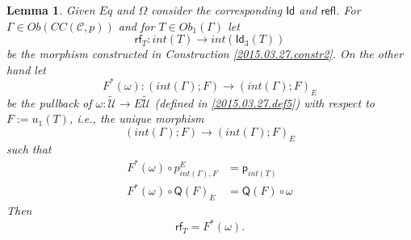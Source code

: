 \documentclass[12pt]{article}
\numberwithin{equation}{section}
\newtheorem{lemma}[proposition]{Lemma}
\newcommand{\sr}{\rightarrow}
\newcommand{\wt}{\widetilde}
\newcommand{\toCC}{CC} %
\newcommand{\C}{{\mathcal C}}  %
\newcommand{\p}{\mathsf{p}}
\newcommand{\Id}{\mathsf{Id}} %
\newcommand{\Idx}{\mathsf{Id}_3} %
\newcommand{\refl}{\mathsf{refl}}
\newcommand{\U}{\mathcal{U}}
\newcommand{\rf}{\mathsf{rf}}
\newcommand{\Q}{\mathsf{Q}}
\begin{document}
\begin{lemma}
\label{2015.03.31.l2} Given $Eq$ and $\Omega$ consider the corresponding $\Id$
and $\refl$. For $\Gamma \in Ob(\toCC({\C},p))$ and for $T\in Ob_1(\Gamma)$ let
$$\rf_T:int(T)\sr int(\Idx(T))$$
%
be the morphism constructed in Construction \ref{2015.03.27.constr2}. On the
other hand let
%
$$F^*(\omega):(int(\Gamma);F)\sr (int(\Gamma);F)_{E}$$
%
be the pullback of $\omega : \wt{\U}\sr E\wt{\U}$ (defined in \ref{2015.03.27.def5}) with respect to $F:=u_1(T)$,
i.e., the unique morphism
%
$$(int(\Gamma);F)\sr (int(\Gamma);F)_{E}$$
%
such that
%
\begin{align}
  F^*(\omega)\circ p^{E}_{int(\Gamma),F} & = \p_{int(T)}          \label{eqn1} \\
  F^*(\omega)\circ \Q(F)_{E}             & = \Q(F) \circ \omega   \label{eqn2}
\end{align}
%
Then
%
\[\rf_T=F^*(\omega).\]
%
\end{lemma}
%
\end{document}
